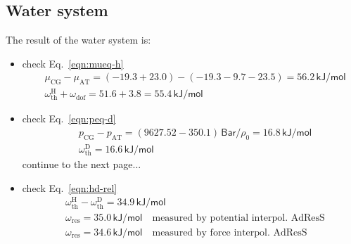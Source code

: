 \documentclass[aip,jcp,a4paper,reprint,onecolumn]{revtex4-1}
\newcommand{\AT}{{\textrm{{AT}}}}
\newcommand{\CG}{{\textrm{CG}}}
\newcommand{\thf}{{\textrm{th}}}
\newcommand{\dof}{{\textrm{dof}}}
\newcommand{\res}{{\textrm{res}}}
\newcommand{\hadress}{{\textrm{H}}}
\newcommand{\dadress}{{\textrm{D}}}
\begin{document}
\subsection{Water system}
The result of the water system is:
\begin{itemize}
\item check Eq.~\eqref{eqn:mueq-h}
  \begin{align}
    &\mu_\CG - \mu_\AT = (-19.3 + 23.0) - (-19.3-9.7-23.5) = 56.2 \,\textsf{kJ/mol}\\
    &\omega^\hadress_\thf + \omega_\dof = 51.6 + 3.8 = 55.4  \,\textsf{kJ/mol}
  \end{align}
\item check Eq.~\eqref{eqn:peq-d}
  \begin{align}
    &p_\CG - p_\AT = (9627.52 - 350.1) \,\textsf{Bar} / \rho_0 = 16.8  \,\textsf{kJ/mol} \\
    &\omega^\dadress_\thf = 16.6  \,\textsf{kJ/mol}
  \end{align}
  continue to the next page...
\item check Eq.~\eqref{eqn:hd-rel}
  \begin{align}
    &\omega^\hadress_\thf - \omega^\dadress_\thf = 34.9 \,\textsf{kJ/mol}\\
    &\omega_\res = 35.0 \,\textsf{kJ/mol} \quad \textrm{measured by potential interpol. AdResS}\\
    &\omega_\res = 34.6 \,\textsf{kJ/mol} \quad \textrm{measured by force interpol. AdResS}
  \end{align}
\end{itemize}


\end{document}
